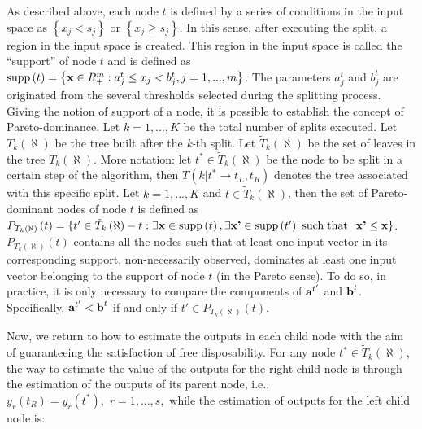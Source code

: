 As described above, each node \(t\) is defined by a series of conditions in the input space as \(\left\{x_{j} <s_{j} \right\}\) or \(\left\{x_{j} \ge s_{j} \right\}\). In this sense, after executing the split, a region in the input space is created. This region in the input space is called the ``support'' of node \(t\) and is defined as \({\rm supp}\left(t\right)=\left\{{\it \textbf{x}}\in R_{+}^{m} :a_{j}^{t} \le x_{j} <b_{j}^{t} ,j=1,...,m\right\}\). The parameters \(a_{j}^{t}\) and \(b_{j}^{t}\) are originated from the several thresholds selected during the splitting process. Giving the notion of support of a node, it is possible to establish the concept of Pareto-dominance. Let \(k=1,...,K\) be the total number of splits executed. Let \(T_{k} \left(\aleph \right)\) be the tree built after the \textit{k-}th split. Let \(\tilde{T}_{k} \left(\aleph \right)\) be the set of leaves in the tree \(T_{k} \left(\aleph \right)\). More notation: let \(t^{*} \in \tilde{T}_{k} \left(\aleph \right)\) be the node to be split in a certain step of the algorithm, then \(T\left(k|t^{*} \to t_{L} ,t_{R} \right)\) denotes the tree associated with this specific split. Let \(k=1,...,K\) and \(t\in \tilde{T}_{k} \left(\aleph \right)\), then the set of Pareto-dominant nodes of node \(t\) is defined as \(P_{T_{k} \left(\aleph \right)} \left(t\right)=\{t'\in \tilde{T}_{k} \left(\aleph \right)-t:\exists {\it \textbf{x}}\in {\rm supp}\left(t\right),\exists {\it \textbf{x'}}\in {\rm supp}\left(t'\right)\, \, {\rm such\; that}\,\) \({\it \textbf{x'}} \le {\it \textbf{x}}\}\). \(P_{T_{k} \left(\aleph \right)} \left(t\right)\) contains all the nodes such that at least one input vector in its corresponding support, non-necessarily observed, dominates at least one input vector belonging to the support of node \(t\) (in the Pareto sense). To do so, in practice, it is only necessary to compare the components of \({\it \textbf{a}}^{t'}\) and \({\it \textbf{b}}^{t}\). Specifically, \({\it \textbf{a}}^{t'} <{\it \textbf{b}}^{t}\) if and only if \(t'\in P_{T_{k} \left(\aleph \right)} \left(t\right)\).

Now, we return to how to estimate the outputs in each child node with the aim of guaranteeing the satisfaction of free disposability. For any node \(t^{*} \in \tilde{T}_{k} \left(\aleph \right)\), the way to estimate the value of the outputs for the right child node is through the estimation of the outputs of its parent node, i.e., \(y_{r} \left(t_{R} \right)=y_{r} (t^{*} ),\, \, r=1,...,s,\) while the estimation of outputs for the left child node is:


